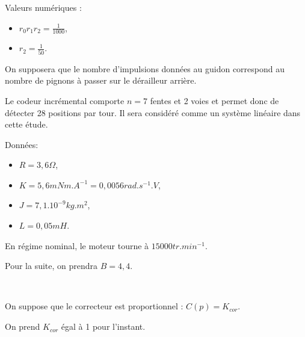 Valeurs numériques :
\begin{itemize}
 \item $r_0r_1r_2=\frac{1}{1000}$,
 \item $r_2=\frac{1}{50}$.
\end{itemize}
 
On supposera que le nombre d'impulsions données au guidon correspond au nombre de pignons à passer sur le dérailleur arrière.

Le codeur incrémental comporte $n=7$ fentes et 2 voies et permet donc de détecter 28 positions par tour. Il sera considéré comme un système linéaire dans cette étude.


Données:
\begin{itemize}
 \item $R=3,6\Omega$,
 \item $K=5,6mNm.A^{-1}=0,0056rad.s^{-1}.V$,
 \item $J=7,1.10^{-9}kg.m^2$,
 \item $L=0,05mH$.
\end{itemize}

En régime nominal, le moteur tourne à $15000tr.min^{-1}$.




Pour la suite, on prendra $B=4,4$.


~\

On suppose que le correcteur est proportionnel : $C(p)=K_{cor}$. 

On prend $K_{cor}$ égal à 1 pour l'instant.



